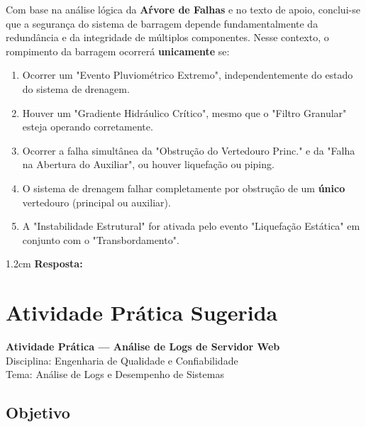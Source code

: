 \documentclass[12pt,a4paper]{report}
\begin{document}
Com base na an\'alise l\'ogica da \textbf{A\'rvore de Falhas} e no texto de apoio, conclui-se que a seguran\c{c}a do sistema de barragem depende fundamentalmente da redund\^ancia e da integridade de m\'ultiplos componentes. Nesse contexto, o rompimento da barragem ocorrer\'a \textbf{unicamente} se:

\begin{enumerate}[label=\Alph*)]
  \item Ocorrer um "Evento Pluviom\'etrico Extremo", independentemente do estado do sistema de drenagem.
  \item Houver um "Gradiente Hidr\'aulico Cr\'itico", mesmo que o "Filtro Granular" esteja operando corretamente.
  \item Ocorrer a falha simult\^anea da "Obstru\c{c}\~ao do Vertedouro Princ." e da "Falha na Abertura do Auxiliar", ou houver liquefação ou piping.
  \item O sistema de drenagem falhar completamente por obstrução de um \textbf{único} vertedouro (principal ou auxiliar).
  \item A "Instabilidade Estrutural" for ativada pelo evento "Liquefa\c{c}\~ao Est\'atica" em conjunto com o "Transbordamento".
\end{enumerate}

\begin{resposta}{1.2cm}
  \textbf{Resposta:}
\end{resposta}

\vspace{0.5cm}
\vspace{0.5cm}

\chapter{Atividade Prática Sugerida}



\begin{center}
\Large \textbf{Atividade Prática — Análise de Logs de Servidor Web} \\

\normalsize Disciplina: Engenharia de Qualidade e Confiabilidade \\

\normalsize Tema: Análise de Logs e Desempenho de Sistemas
\end{center}

\vspace{0.5cm}

\section*{Objetivo}
\end{document}
